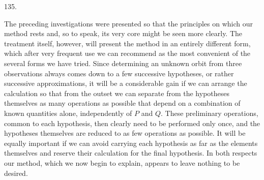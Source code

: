\par{}\medskip
\begin{center}\hypertarget{native-181-article135}{}135.\end{center}
The preceding investigations were presented so that the principles on which our method rests
and, so to speak, its very core might be seen more clearly. The treatment itself, however, will
present the method in an entirely different form, which after very frequent use we can recommend
as the most convenient of the several forms we have tried. Since determining an unknown orbit
from three observations always comes down to a few successive hypotheses, or rather successive
approximations, it will be a considerable gain if we can arrange the calculation so that from
the outset we can separate from the hypotheses themselves as many operations as possible that
depend on a combination of known quantities alone, independently of $P$ and $Q$. These
preliminary operations, common to each hypothesis, then clearly need to be performed only once,
and the hypotheses themselves are reduced to as few operations as possible. It will be equally
important if we can avoid carrying each hypothesis as far as the elements themselves and reserve
their calculation for the \hypertarget{native-182}{}final hypothesis. In both respects our method, which we now begin
to explain, appears to leave nothing to be desired.
